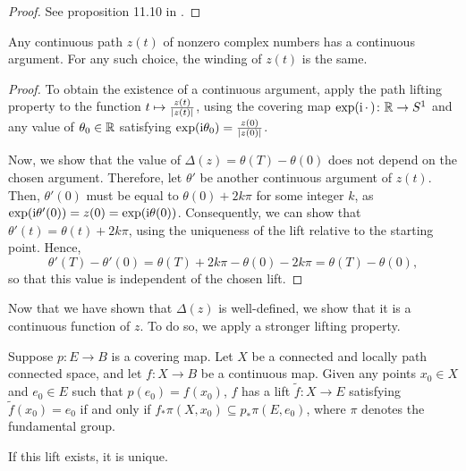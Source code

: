 \begin{proof}
See proposition 11.10 in \cite{leetopological}.
\end{proof}

\begin{corollary}
Any continuous path $z(t)$ of nonzero complex numbers has a continuous argument. For any such choice, the winding of $z(t)$ is the same.
\end{corollary}

\begin{proof}
To obtain the existence of a continuous argument, apply the path lifting property to the function $t \mapsto \frac{z(t)}{\lvert z(t)\rvert}$, using the covering map $\exp(\mathrm{i}\,\cdot\,) \colon \mathbb{R} \to S^1$ and any value of $\theta_0 \in \mathbb{R}$ satisfying $\exp(\mathrm{i} \theta_0) = \frac{z(0)}{\lvert z(0)\rvert}$.

Now, we show that the value of $\Delta(z) = \theta(T) - \theta(0)$ does not depend on the chosen argument. Therefore, let $\theta'$ be another continuous argument of $z(t)$. Then, $\theta'(0)$ must be equal to $\theta(0) + 2 k \pi$ for some integer $k$, as $\exp(\mathrm{i}\theta'(0)) = z(0) = \exp(\mathrm{i} \theta(0))$. Consequently, we can show that $\theta'(t) = \theta(t) + 2 k \pi$, using the uniqueness of the lift relative to the starting point. Hence,
\begin{equation}
\theta'(T) - \theta'(0) = \theta(T) + 2 k \pi -  \theta(0) - 2 k \pi = \theta(T) - \theta(0),
\end{equation}
so that this value is independent of the chosen lift.
\end{proof}

Now that we have shown that $\Delta(z)$ is well-defined, we show that it is a continuous function of $z$. To do so, we apply a stronger lifting property.

\begin{prop}\label{prop:liftcriterion}
Suppose $p \colon E \to B$ is a covering map. Let $X$ be a connected and locally path connected space, and let $f \colon X \to B$ be a continuous map. Given any points $x_0 \in X$ and $e_0 \in E$ such that $p(e_0) = f(x_0)$, $f$ has a lift $\tilde f \colon X \to E$ satisfying $\tilde f(x_0) = e_0$ if and only if $f_* \pi(X,x_0) \subseteq p_* \pi(E,e_0)$, where $\pi$ denotes the fundamental group.

If this lift exists, it is unique.
\end{prop}

